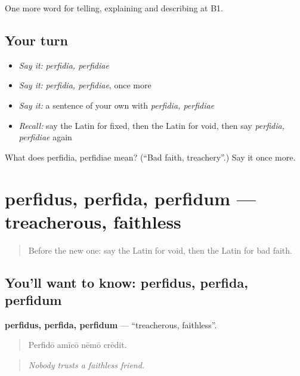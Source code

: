 \begin{grammarlens}[title={What you've built}]
One more word for telling, explaining and describing at B1.
\end{grammarlens}

\subsection*{Your turn}
\begin{itemize}
\raggedright
  \item \emph{Say it:} \emph{perfidia, perfidiae}
  \item \emph{Say it:} \emph{perfidia, perfidiae}, once more
  \item \emph{Say it:} a sentence of your own with \emph{perfidia, perfidiae}
  \item \emph{Recall:} say the Latin for fixed, then the Latin for void, then say \emph{perfidia, perfidiae} again
\end{itemize}

\begin{tcolorbox}[breakable,colback=teal!4,colframe=teal!35!black,title={Before you move on}]
What does perfidia, perfidiae mean? (\textquotedblleft{}Bad faith, treachery\textquotedblright{}.) Say it once more.
\end{tcolorbox}
\section[perfidus, perfida, perfidum]{perfidus, perfida, perfidum — treacherous, faithless}

\label{lesson:LA-C399-perfidus}



\begin{quote}
Before the new one: say the Latin for void, then the Latin for bad faith.
\end{quote}

\subsection*{You'll want to know: perfidus, perfida, perfidum}
\textbf{perfidus, perfida, perfidum} — \textquotedblleft{}treacherous, faithless\textquotedblright{}.

\begin{quote}
Perfidō amīcō nēmō crēdit.
\end{quote}

\begin{quote}
\emph{Nobody trusts a faithless friend.}
\end{quote}

